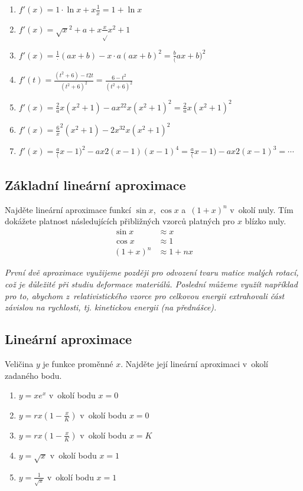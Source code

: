 \def\der#1.{$f'(x)=#1$}
\reseni
  \begin{enumerate}
  \item \der 1\cdot \ln x+x\frac 1x=1+\ln x.
  \item \der \sqrt{x^2+a}+x\frac{x}{\sqrt{x^2+1}}.
  \item \der \frac{1\cdot (ax+b)-x\cdot a}{(ax+b)^2}=\frac b{(ax+b)^2}.
  \item $f'(t)=\frac{(t^2+6)-t2t}{(t^2+6)^2}=\frac{6-t^2}{(t^2+6)^2}$
  \item \der \frac {2ax(x^2+1)-ax^22x}{(x^2+1)^2}=\frac {2ax}{(x^2+1)^2}.
  \item \der \frac {6x^2(x^2+1)-2x^32x}{(x^2+1)^2}.
  \item \der \frac{a(x-1)^2-ax2(x-1)}{(x-1)^4}= \frac{a(x-1)-ax2}{(x-1)^3}=\cdots.
  \end{enumerate}
\konec



\stranka


\subsection{Základní lineární aproximace}
Najděte lineární aproximace funkcí $\sin x$, $\cos x$ a~${(1+x)^n}$ v okolí nuly. Tím dokážete platnost následujících přibližných vzorců platných pro $x$ blízko nuly.
\begin{align*}
\sin x&\approx  x\\
\cos x&\approx  1\\
(1+x)^n&\approx  1+nx
\end{align*}

\textit{První dvě aproximace využijeme později pro odvození tvaru matice malých rotací, což je důležité při studiu deformace materiálů. Poslední můžeme využít například pro to, abychom z relativistického vzorce pro  celkovou energii extrahovali část závislou na rychlosti, tj. kinetickou energii (na přednášce).
}


\stranka
\subsection{Lineární aproximace} \label{aproximace}Veličina $y$ je funkce proměnné $x$. Najděte její lineární aproximaci v okolí zadaného bodu.
\begin{enumerate}[1)]
   pt
\item $y=xe^x$ v okolí bodu $x=0$
\item $y=rx\left(1-\frac xK\right)$ v okolí bodu $x=0$
\item $y=rx\left(1-\frac xK\right)$ v okolí bodu $x=K$
\item $y=\sqrt x$ v okolí bodu $x=1$
\item $y=\frac 1{\sqrt x}$ v okolí bodu $x=1$
\end{enumerate}

